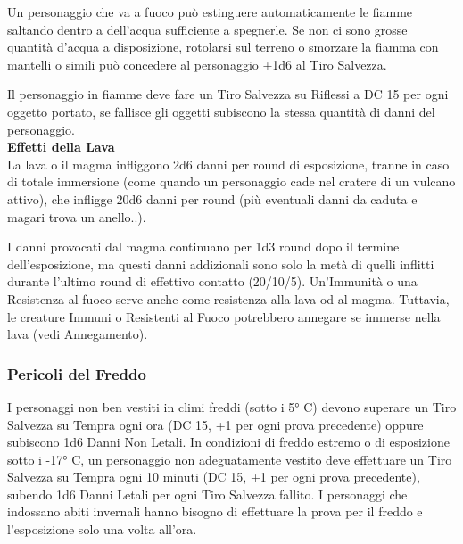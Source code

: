 \begin{multicols}{2}
Un personaggio che va a fuoco può estinguere automaticamente le fiamme saltando dentro a dell'acqua sufficiente a spegnerle. Se non ci sono grosse quantità d'acqua a disposizione, rotolarsi sul terreno o smorzare la fiamma con mantelli o simili può concedere al personaggio +1d6 al Tiro Salvezza.

Il personaggio in fiamme deve fare un Tiro Salvezza su Riflessi a DC 15 per ogni oggetto portato, se fallisce gli oggetti subiscono la stessa quantità di danni del personaggio.\\

\textbf{Effetti della Lava}\\

La lava o il magma infliggono 2d6 danni per round di esposizione, tranne in caso di totale immersione (come quando un personaggio cade nel cratere di un vulcano attivo), che infligge 20d6 danni per round (più eventuali danni da caduta e magari trova un anello..).

I danni provocati dal magma continuano per 1d3 round dopo il termine dell'esposizione, ma questi danni addizionali sono solo la metà di quelli inflitti durante l'ultimo round di effettivo contatto (20/10/5). Un'Immunità o una Resistenza al fuoco serve anche come resistenza alla lava od al magma. Tuttavia, le creature Immuni o Resistenti al Fuoco potrebbero annegare se immerse nella lava (vedi Annegamento).

\subsubsection{Pericoli del Freddo}

\label{pericoli-del-freddo}

I personaggi non ben vestiti in climi freddi (sotto i 5° C) devono superare un Tiro Salvezza su Tempra ogni ora (DC 15, +1 per ogni prova precedente) oppure subiscono 1d6 Danni Non Letali.
In condizioni di freddo estremo o di esposizione sotto i -17° C, un personaggio non adeguatamente vestito deve effettuare un Tiro Salvezza su Tempra ogni 10 minuti (DC 15, +1 per ogni prova precedente), subendo 1d6 Danni Letali per ogni Tiro Salvezza fallito. I personaggi che indossano abiti invernali hanno bisogno di effettuare la prova per il freddo e l'esposizione solo una volta all'ora.


\end{multicols}
